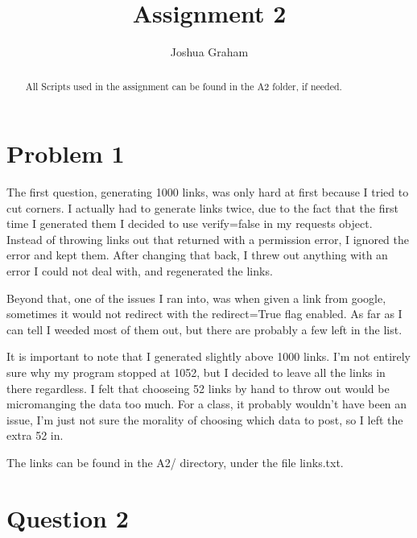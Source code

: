 \documentclass{article}
\begin{document}
\title{Assignment 2}
\author{Joshua Graham}

\maketitle
\pagebreak
\begin{abstract}
All Scripts used in the assignment can be found in the A2 folder, if needed.

\end{abstract}

\section{Problem 1}
	The first question, generating 1000 links, was only hard at first because I tried to cut corners. I actually had to generate links twice, due to the fact that the first time I generated them I decided to use verify=false in my requests object. Instead of throwing links out that returned with a permission error, I ignored the error and kept them. After changing that back, I threw out anything with an error I could not deal with, and regenerated the links.

Beyond that, one of the issues I ran into, was when given a link from google, sometimes it would not redirect with the redirect=True flag enabled. As far as I can tell I weeded most of them out, but there are probably a few left in the list.

It is important to note that I generated slightly above 1000 links. I'm not entirely sure why my program stopped at 1052, but I decided to leave all the links in there regardless. I felt that chooseing 52 links by hand to throw out would be micromanging the data too much. For a class, it probably wouldn't have been an issue, I'm just not sure the morality of choosing which data to post, so I left the extra 52 in.

The links can be found in the A2/ directory, under the file links.txt.
\pagebreak
\section{Question 2}
\end{document}
